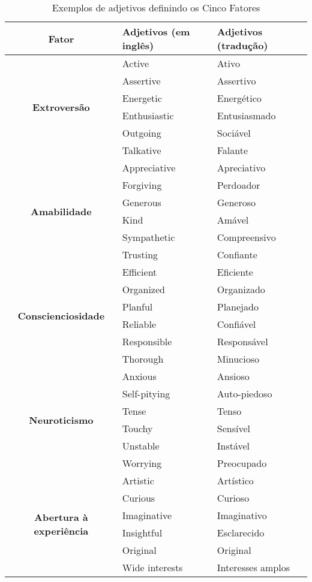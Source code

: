 \begin{table*}[h]
\footnotesize
\caption{\small Exemplos de adjetivos definindo os Cinco Fatores} 
\addtolength{\tabcolsep}{-3.5pt}
\renewcommand{\arraystretch}{1.3} 
\centering
	
		    \begin{tabular}{|c|l|l|}
    \hline %
    \textbf{Fator} & \textbf{Adjetivos (em inglês)} & \textbf{Adjetivos (tradução)} \\
    \hline %
    \multirow{6}[2]{*}{\textbf{Extroversão}} & Active & Ativo \\
          & Assertive & Assertivo \\
          & Energetic & Energético \\
          & Enthusiastic & Entusiasmado \\
          & Outgoing & Sociável \\
          & Talkative & Falante \\ \hline
    \multirow{6}[2]{*}{\textbf{Amabilidade}} & Appreciative & Apreciativo \\
          & Forgiving & Perdoador \\
          & Generous & Generoso \\
          & Kind  & Amável \\
          & Sympathetic & Compreensivo \\
          & Trusting & Confiante \\ \hline
		\multirow{6}[1]{*}{\textbf{Conscienciosidade}} & Efficient & Eficiente \\
          & Organized & Organizado \\
          & Planful & Planejado \\
          & Reliable & Confiável \\
          & Responsible & Responsável \\
          & Thorough & Minucioso \\ \hline
    \multirow{6}[0]{*}{\textbf{Neuroticismo}} & Anxious & Ansioso \\
          & Self-pitying & Auto-piedoso \\
          & Tense & Tenso \\
          & Touchy & Sensível \\
          & Unstable & Instável \\
          & Worrying & Preocupado \\ \hline
    \multirow{6}[0]{*}{\textbf{Abertura à experiência}} & Artistic & Artístico \\
          & Curious & Curioso \\
          & Imaginative & Imaginativo \\
          & Insightful & Esclarecido \\
          & Original & Original \\
          & Wide interests & Interesses amplos \\
    \hline %
    \end{tabular}%
		\label{tab:adjetivos}
\end{table*}

